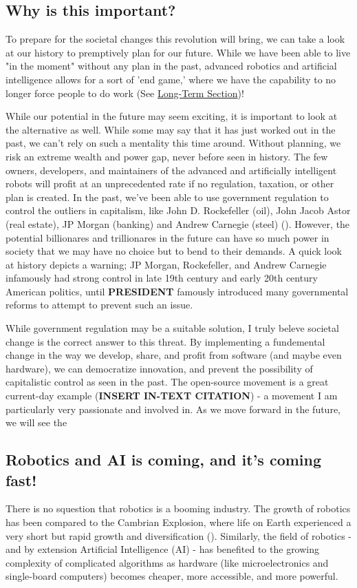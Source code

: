 \subsection{Why is this important?}

To prepare for the societal changes this revolution will bring, we can take a look at our history to premptively plan for our future. While we have been able to live "in the moment" without any plan in the past, advanced robotics and artificial intelligence allows for a sort of 'end game,' where we have the capability to no longer force people to do work (See \hyperlink{sec:long}{Long-Term Section})!

While our potential in the future may seem exciting, it is important to look at the alternative as well. While some may say that it has just worked out in the past, we can't rely on such a mentality this time around. Without planning, we risk an extreme wealth and power gap, never before seen in history. The few owners, developers, and maintainers of the advanced and artificially intelligent robots will profit at an unprecedented rate if no regulation, taxation, or other plan is created. In the past, we've been able to use government regulation to control the outliers in capitalism, like John D. Rockefeller (oil), John Jacob Astor (real estate), JP Morgan (banking) and Andrew Carnegie (steel) (\cite{CapitalistAmerica}). However, the potential billionares and trillionares in the future can have so much power in society that we may have no choice but to bend to their demands. A quick look at history depicts a warning; JP Morgan, Rockefeller, and Andrew Carnegie infamously had strong control in late 19th century and early 20th century American politics, until \textbf{PRESIDENT} famously introduced many governmental reforms to attempt to prevent such an issue.

While government regulation may be a suitable solution, I truly beleve societal change is the correct answer to this threat. By implementing a fundemental change in the way we develop, share, and profit from software (and maybe even hardware), we can democratize innovation, and prevent the possibility of capitalistic control as seen in the past. The open-source movement is a great current-day example (\textbf{INSERT IN-TEXT CITATION}) - a movement I am particularly very passionate and involved in. As we move forward in the future, we will see the 

\subsection{Robotics and AI is coming, and it's coming fast!}
There is no squestion that robotics is a booming industry.  The growth of robotics has been compared to the Cambrian Explosion, where life on Earth experienced a very short but rapid growth and diversification (\cite{Cambrian}). Similarly, the field of robotics - and by extension Artificial Intelligence (AI) - has benefited to the growing complexity of complicated algorithms as hardware (like microelectronics and single-board computers) becomes cheaper, more accessible, and more powerful. 

